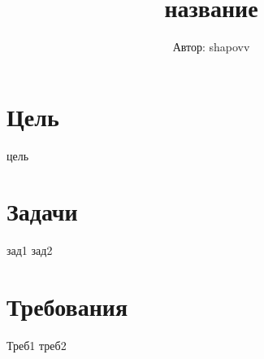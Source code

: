 \documentclass{article}%
\title{название}%
\author{Автор: shapovv}%
\date{}%
\begin{document}
%
\normalsize%
\maketitle%
\section{Цель}%
\label{sec:goal}%
цель

%
\section{Задачи}%
\label{sec:tasks}%
зад1\newline%
%
зад2\newline%

%
\section{Требования}%
\label{sec:requirements}%
Треб1\newline%
%
треб2\newline%

%
\end{document}
